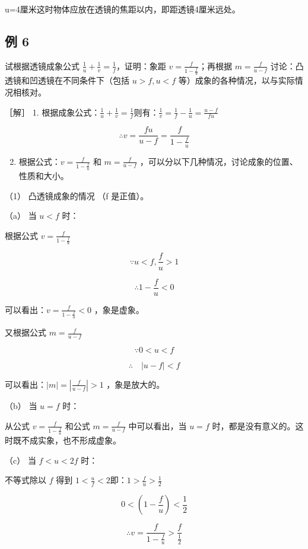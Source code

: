 u=4厘米这时物体应放在透镜的焦距以内，即距透镜4厘米远处。

\subsection{例 6}

试根据透镜成象公式
\(\frac{1}{u} + \frac{1}{v} = \frac{1}{f}\)，证明：象距
\(v = \frac{f}{1 - \frac{f}{u}}\)；再根据 \(m = \frac{f}{u - f}\)
讨论：凸透镜和凹透镜在不同条件下（包括 \(u > f, u < f\)
等）成象的各种情况，以与实际情况相核对。

［解］ 1.
根据成象公式：\(\frac{1}{u} + \frac{1}{v} = \frac{1}{f}\)则有：\(\frac{1}{v} = \frac{1}{f} -\frac{1}{u} = \frac{u - f}{fu}\)

\[
\therefore v = \frac {f u}{u - f} = \frac {f}{1 - \frac {f}{u}}
\]

\begin{enumerate}
\setcounter{enumi}{1}
\item
  根据公式：\(v=\frac{f}{1-\frac{f}{u}}\) 和 \(m=\frac{f}{u-f}\)
  ，可以分以下几种情况，讨论成象的位置、性质和大小。
\end{enumerate}

（1） 凸透镜成象的情况 （f 是正值）。

（a） 当 \(u < f\) 时：

根据公式 \(v = \frac{f}{1 - \frac{f}{u}}\)

\[
\because u <   f, \frac {f}{u} > 1
\]

\[
\therefore 1 - \frac {f}{u} <   0
\]

可以看出：\(v=\frac{f}{1-\frac{f}{u}}<0\) ，象是虚象。

又根据公式 \(m = \frac{f}{u - f}\)

\[
\because 0 <   u <   f
\]

\[
\therefore \quad | u - f | <   f
\]

可以看出：\(|m|=\left|\frac{f}{u-f}\right|>1\) ，象是放大的。

（b） 当 \(u = f\) 时：

从公式 \(v = \frac{f}{1 - \frac{f}{u}}\) 和公式 \(m = \frac{f}{u - f}\)
中可以看出，当 \(u = f\)
时，都是没有意义的。这时既不成实象，也不形成虚象。

（c） 当 \(f < u < 2f\) 时：

不等式除以 \(f\) 得到
\(1 < \frac{u}{f} < 2\)即：\(1 > \frac{f}{u} >\frac{1}{2}\)

\[
0 <   \left(1 - \frac {f}{u}\right) <   \frac {1}{2}
\]

\[
\therefore v = \frac {f}{1 - \frac {f}{u}} > \frac {f}{\frac {1}{2}}
\]

